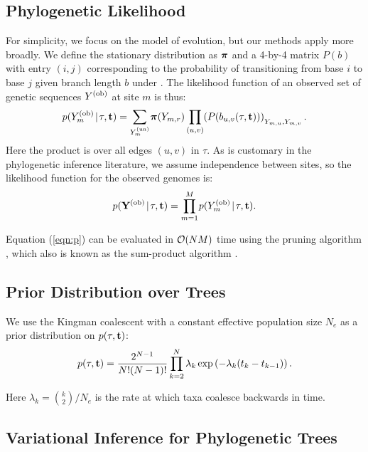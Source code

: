 \subsection{Phylogenetic Likelihood}

For simplicity, we focus on the  \citet{Jukes:1969} model of evolution, but our methods apply more broadly. We define the stationary distribution as $\boldsymbol{\pi}$ and a 4-by-4 matrix $P(b)$ with entry $(i,j)$ corresponding to the probability of transitioning from base $i$ to base $j$ given branch length $b$ under \citet{Jukes:1969}. The likelihood function of an observed set of genetic sequences $Y^{{(\text{ob})}}$ at site $m$ is thus:
%
\begin{gather}
    p(Y_m^{{(\text{ob})}}\!\mid\!\tau, \mathbf{t}) = \sum_{Y_m^{{(\text{un})}}} \hspace{-0.1em}\boldsymbol{\pi}(Y_{m,r}) \prod_{(u,v)}\hspace{-0.2em} \left(P(b_{u,v}(\tau,\mathbf{t}))\right)_{{\textstyle\mathstrut}Y_{m,u},Y_{m,v}}.
\end{gather}
%
Here the product is over all edges $(u,v)$ in $\tau$. As is customary in the phylogenetic inference literature, we assume independence between sites, so the likelihood function for the observed genomes is:
%
\begin{equation}
    \label{eqn:p}
    p(\mathbf{Y}^{{(\text{ob})}}\!\mid\!\tau, \mathbf{t}) = \prod_{m=1}^M\hspace{-0.1em} p(Y^{{(\text{ob})}}_m\!\mid\!\tau, \mathbf{t}).
\end{equation}

Equation (\ref{eqn:p}) can be evaluated in $\mathcal{O}(NM)$ time using the pruning algorithm \citep{Felsenstein:1981}, which also is known as the sum-product algorithm \citep{Koller:2009}.

\subsection{Prior Distribution over Trees}

We use the Kingman coalescent \citep{Kingman:1982} with a constant effective population size $N_e$ as a prior distribution on $p(\tau,\mathbf{t})$:
%
\begin{equation}
    p(\tau,\mathbf{t}) = \frac{2^{N-1}}{N!(N-1)!} \prod_{k=2}^N \lambda_k \exp \left(-\lambda_k (t_{k} - t_{k-1})\right).
\end{equation}

Here $\lambda_k = \binom{k}{2}/N_e$ is the rate at which taxa coalesce backwards in time.

\subsection{Variational Inference for Phylogenetic Trees}

